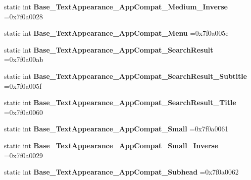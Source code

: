 \begin{DoxyCompactItemize}
static int {\bfseries Base\+\_\+\+Text\+Appearance\+\_\+\+App\+Compat\+\_\+\+Medium\+\_\+\+Inverse} =0x7f0a0028
\item 
\mbox{\label{classandroid_1_1support_1_1v7_1_1cardview_1_1R_1_1style_a58c83eed4c4baf172913dbb4ed3094ff}} 
static int {\bfseries Base\+\_\+\+Text\+Appearance\+\_\+\+App\+Compat\+\_\+\+Menu} =0x7f0a005e
\item 
\mbox{\label{classandroid_1_1support_1_1v7_1_1cardview_1_1R_1_1style_aa5de4305be1923b8409a5f61c61dbbe1}} 
static int {\bfseries Base\+\_\+\+Text\+Appearance\+\_\+\+App\+Compat\+\_\+\+Search\+Result} =0x7f0a00ab
\item 
\mbox{\label{classandroid_1_1support_1_1v7_1_1cardview_1_1R_1_1style_aaeea27423ddaf9bae019903f7f24f463}} 
static int {\bfseries Base\+\_\+\+Text\+Appearance\+\_\+\+App\+Compat\+\_\+\+Search\+Result\+\_\+\+Subtitle} =0x7f0a005f
\item 
\mbox{\label{classandroid_1_1support_1_1v7_1_1cardview_1_1R_1_1style_adafb7d6819e62a31be897c85fb469b57}} 
static int {\bfseries Base\+\_\+\+Text\+Appearance\+\_\+\+App\+Compat\+\_\+\+Search\+Result\+\_\+\+Title} =0x7f0a0060
\item 
\mbox{\label{classandroid_1_1support_1_1v7_1_1cardview_1_1R_1_1style_a296fb51f6abd342b6a83724839825519}} 
static int {\bfseries Base\+\_\+\+Text\+Appearance\+\_\+\+App\+Compat\+\_\+\+Small} =0x7f0a0061
\item 
\mbox{\label{classandroid_1_1support_1_1v7_1_1cardview_1_1R_1_1style_ae4f23173da849db34f82009acca054dc}} 
static int {\bfseries Base\+\_\+\+Text\+Appearance\+\_\+\+App\+Compat\+\_\+\+Small\+\_\+\+Inverse} =0x7f0a0029
\item 
\mbox{\label{classandroid_1_1support_1_1v7_1_1cardview_1_1R_1_1style_a1a0e85476dd131c0040585276097e3e4}} 
static int {\bfseries Base\+\_\+\+Text\+Appearance\+\_\+\+App\+Compat\+\_\+\+Subhead} =0x7f0a0062

\end{DoxyCompactItemize}
